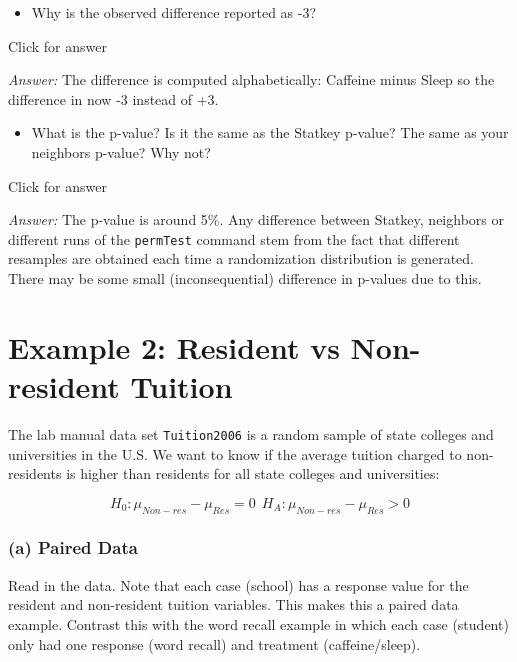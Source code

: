 \documentclass[
]{book}
\providecommand{\tightlist}{%
  \setlength{\itemsep}{0pt}\setlength{\parskip}{0pt}}
\begin{document}
\begin{itemize}
\tightlist
\item
  Why is the observed difference reported as -3?
\end{itemize}

Click for answer

\emph{Answer:} The difference is computed alphabetically: Caffeine minus Sleep so the difference in now -3 instead of +3.

\begin{itemize}
\tightlist
\item
  What is the p-value? Is it the same as the Statkey p-value? The same as your neighbors p-value? Why not?
\end{itemize}

Click for answer

\emph{Answer:} The p-value is around 5\%. Any difference between Statkey, neighbors or different runs of the \texttt{permTest} command stem from the fact that different resamples are obtained each time a randomization distribution is generated. There may be some small (inconsequential) difference in p-values due to this.

\hypertarget{example-2-resident-vs-non-resident-tuition}{%
\section{Example 2: Resident vs Non-resident Tuition}\label{example-2-resident-vs-non-resident-tuition}}

The lab manual data set \texttt{Tuition2006} is a random sample of state colleges and universities in the U.S. We want to know if the average tuition charged to non-residents is higher than residents for all state colleges and universities:

\[
H_0: \mu_{Non-res} - \mu_{Res} = 0 \ \ H_A: \mu_{Non-res} - \mu_{Res} > 0
\]

\hypertarget{a-paired-data}{%
\subsubsection{(a) Paired Data}\label{a-paired-data}}

Read in the data. Note that each case (school) has a response value for the resident and non-resident tuition variables. This makes this a paired data example. Contrast this with the word recall example in which each case (student) only had one response (word recall) and treatment (caffeine/sleep).
\end{document}
